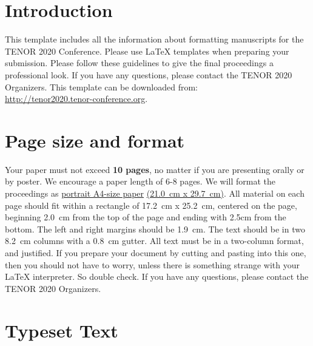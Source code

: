 \documentclass{article}
\title{\papertitle}
\begin{document}
%
\capstartfalse
\maketitle
\capstarttrue
%
\begin{abstract}
Place your abstract at the top left column on the first page.
Please write about 150-200 words that specifically highlight the purpose of your work,
its context, and provide a brief synopsis of your results.
Avoid equations in this part.
\end{abstract}
%

\section{Introduction}\label{sec:introduction}
This template includes all the information about formatting manuscripts for 
the TENOR 2020 Conference.
Please use \LaTeX{} templates when 
preparing your submission.
Please follow these guidelines to give the final proceedings a professional look.
If you have any questions, please contact the TENOR 2020 Organizers.
This template can be downloaded from:\\
\url{http://tenor2020.tenor-conference.org}.

\section{Page size and format}\label{sec:page_size}
Your paper must not exceed {\bf 10 pages},
no matter if you are presenting orally or by poster.
We encourage a paper length of 6-8 pages.
We will format the proceedings as
 \underline{portrait A4-size paper} \underline{(21.0~cm x 29.7~cm)}.
All material on each page should fit within a rectangle of 17.2~cm x 25.2~cm,
centered on the page, beginning 2.0~cm from the top of the page and ending 
with 2.5cm from the bottom.
The left and right margins should be 1.9~cm.
The text should be in two 8.2~cm columns with a 0.8~cm gutter.
All text must be in a two-column format, and justified.
If you prepare your document by cutting and pasting into this one,
then you should not have to worry, 
unless there is something strange with your \LaTeX{} interpreter.
So double check.
If you have any questions, please contact the TENOR 2020 Organizers.

\section{Typeset Text}\label{sec:typeset_text}
\end{document}
